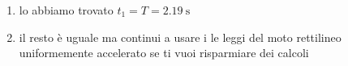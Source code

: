 \documentclass{article}
\begin{document}
\begin{enumerate}[label=\arabic*]
\begin{enumerate}[label=\alph*)]
\begin{equation*}
                        \begin{cases}
                            t_1 = \frac{4\pi \cdot \SI{0.4}{\meter}}{\SI{0.3}{\meter\per\second} + \SI{2}{\meter\per\second}} \approx \SI{2.19}{\second} \\
                            a_t = \frac{\SI{0.3}{\meter\per\second} - \SI{2}{\meter\per\second}}{\SI{2.19}{\second}} \approx \SI{-0.78}{\meter\per\second\squared}
                        \end{cases}
                    \end{equation*}
                    \begin{equation*}
                        \colorbox{myblue!70}{$a_t = \SI{-0.78}{\meter\per\second\squared}$}
                    \end{equation*}
              \item lo abbiamo trovato \(t_1 = T = \SI{2.19}{\second}\)
              \item il resto è uguale ma continui a usare i le leggi del moto rettilineo uniformemente accelerato se ti vuoi risparmiare dei calcoli
          \end{enumerate}
\end{enumerate}
\end{document}
